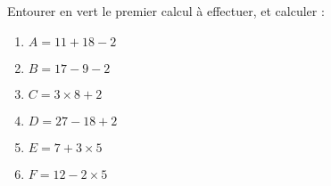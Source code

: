 
\begin{exercice}\label{exosmath-0728}

    Entourer en vert le premier calcul à effectuer, et calculer :
    \begin{multicols}{2}
        \begin{enumerate}
\item
$A = 11 + 18 - 2$
\item
$B = 17 - 9 - 2$
\item
$C = 3\times 8 + 2$
\item
$D = 27 - 18 + 2$
\item
$E = 7 + 3\times5$
\item
$F = 12 - 2\times 5$
        \end{enumerate}
    \end{multicols}

\end{exercice}
